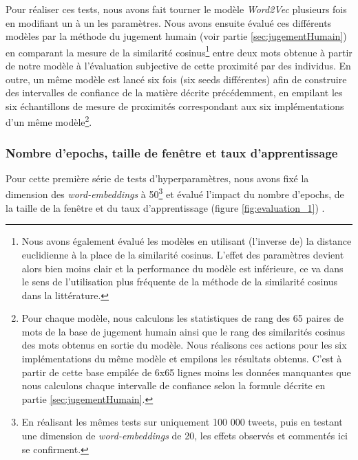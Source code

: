 \documentclass[11pt,french,french]{article}
\let\rmarkdownfootnote\footnote%
\def\footnote{\protect\rmarkdownfootnote}
\begin{document}
Pour réaliser ces tests, nous avons fait tourner le modèle \emph{Word2Vec} plusieurs fois en modifiant un à un les paramètres. Nous avons ensuite évalué ces différents modèles par la méthode du \og jugement humain \fg{} (voir partie \ref{sec:jugementHumain}) en comparant la mesure de la similarité cosinus\footnote{Nous avons également évalué les modèles en utilisant (l'inverse de) la distance euclidienne à la place de la similarité cosinus.
  L'effet des paramètres devient alors bien moins clair et la performance du modèle est inférieure, ce va dans le sens de l'utilisation plus fréquente de la méthode de la similarité cosinus dans la littérature.}
entre deux mots obtenue à partir de notre modèle à l'évaluation subjective de cette proximité par des individus.
En outre, un même modèle est lancé six fois (six \og seeds \fg{} différentes) afin de construire des intervalles de confiance de la matière décrite précédemment, en empilant les six échantillons de mesure de proximités correspondant aux six implémentations d'un même modèle\footnote{Pour chaque modèle, nous calculons les statistiques de rang des 65 paires de mots de la base de jugement humain ainsi que le rang des similarités cosinus des mots obtenus en sortie du modèle.
  Nous réalisons ces actions pour les six implémentations du même modèle et empilons les résultats obtenus.
  C'est à partir de cette base empilée de 6x65 lignes moins les données manquantes que nous calculons chaque intervalle de confiance selon la formule décrite en partie \ref{sec:jugementHumain}.}.

\hypertarget{nombre-depochs-taille-de-fenuxeatre-et-taux-dapprentissage}{%
\subsubsection{Nombre d'epochs, taille de fenêtre et taux d'apprentissage}\label{nombre-depochs-taille-de-fenuxeatre-et-taux-dapprentissage}}

Pour cette première série de tests d'hyperparamètres, nous avons fixé la dimension des \emph{word-embeddings} à 50\footnote{En réalisant les mêmes tests sur uniquement 100 000 tweets, puis en testant une dimension de \emph{word-embeddings} de 20, les effets observés et commentés ici se confirment.} et évalué l'impact du nombre d'epochs, de la taille de la fenêtre et du taux d'apprentissage (figure \ref{fig:evaluation_1}) .
\end{document}
